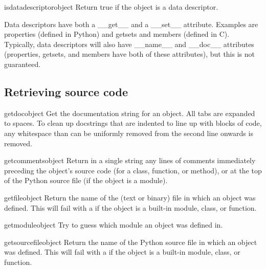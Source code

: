 \begin{funcdesc}{isdatadescriptor}{object}
  Return true if the object is a data descriptor.

  Data descriptors have both a __get__ and a __set__ attribute.  Examples are
  properties (defined in Python) and getsets and members (defined in C).
  Typically, data descriptors will also have __name__ and __doc__ attributes 
  (properties, getsets, and members have both of these attributes), but this 
  is not guaranteed.
\end{funcdesc}

\subsection{Retrieving source code
            \label{inspect-source}}

\begin{funcdesc}{getdoc}{object}
  Get the documentation string for an object.
  All tabs are expanded to spaces.  To clean up docstrings that are
  indented to line up with blocks of code, any whitespace than can be
  uniformly removed from the second line onwards is removed.
\end{funcdesc}

\begin{funcdesc}{getcomments}{object}
  Return in a single string any lines of comments immediately preceding
  the object's source code (for a class, function, or method), or at the
  top of the Python source file (if the object is a module).
\end{funcdesc}

\begin{funcdesc}{getfile}{object}
  Return the name of the (text or binary) file in which an object was
  defined.  This will fail with a  if the object
  is a built-in module, class, or function.
\end{funcdesc}

\begin{funcdesc}{getmodule}{object}
  Try to guess which module an object was defined in.
\end{funcdesc}

\begin{funcdesc}{getsourcefile}{object}
  Return the name of the Python source file in which an object was
  defined.  This will fail with a  if the object
  is a built-in module, class, or function.
\end{funcdesc}

